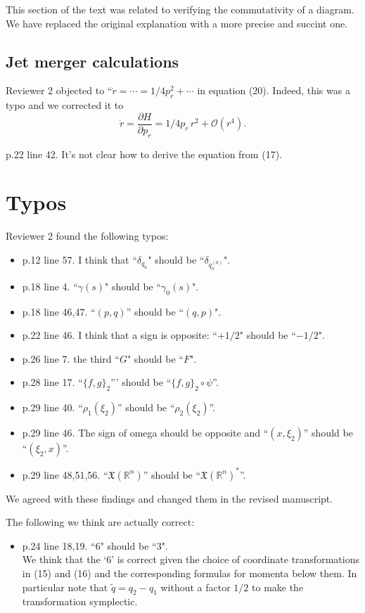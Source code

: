 \documentclass{article}
\begin{document}
This section of the text was related to verifying the commutativity of a diagram.  We have replaced the original explanation with a more precise and succint one.

\subsection{Jet merger calculations}
Reviewer 2 objected to ``$\dot{r} = \cdots = 1/4 p_r^2 + \cdots$ in
equation (20). Indeed, this was a typo and we corrected it to
\begin{equation*}
  \dot{r} = \frac{\partial H}{\partial p_r} = 1/4 p_r\,r^2 + \mathcal{O}(r^4).
\end{equation*}

p.22 line 42. It's not clear how to derive the equation from (17). 
\\

\section{Typos}
Reviewer 2 found the following typos:
\begin{itemize}
 \item p.12 line 57. I think that ``$\delta_{q_a}$" should be ``$\delta_{q_a^{(0)}}$". 
\item p.18 line 4. ``$\gamma(s)$" should be ``$\gamma_0(s)$". 
\item p.18 line 46,47. ``$(p, q)$'' should be ``$(q, p)$". 
\item p.22 line 46. I think that a sign is opposite: ``$+ 1/2$" should be ``$-1/2$".
\item p.26 line 7. the third ``$G$" should be ``$F$".  
\item p.28 line 17. ``$\{f, g \}_2$''' should be ``$\{f, g \}_2 \circ \psi$''. 
\item p.29 line 40. ``$\rho_1(\xi_2)$'' should be ``$\rho_2(\xi_2)$''. 
\item p.29 line 46. The sign of omega should be opposite and ``$(x, \xi_2)$'' 
should be ``$(\xi_2, x)$''. 
\\
\item p.29 line 48,51,56. 
``$\mathfrak{X}(\mathbb{R}^n)$'' should be 
``$\mathfrak{X}(\mathbb{R}^n)^*$''. 
\end{itemize}

We agreed with these findings and changed them in the revised manuscript.

The following we think are actually correct:
\begin{itemize}
\item p.24 line 18,19. ``$6$" should be ``$3$".\\
  We think that the `$6$' is correct given the choice of coordinate
  transformations in (15) and (16) and the corresponding formulas for
  momenta below them. In particular note that $\tilde{q} = q_2 - q_1$
  without a factor $1/2$ to make the transformation symplectic.
\end{itemize}
\end{document}
